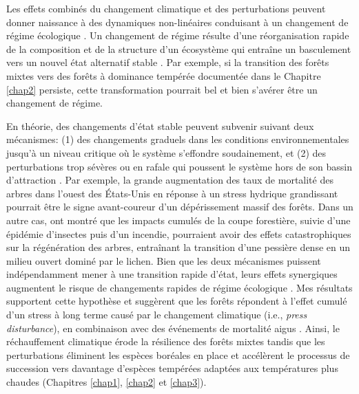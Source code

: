 Les effets combinés du changement climatique et des perturbations
peuvent donner naissance à des dynamiques non-linéaires conduisant à un
changement de régime écologique \citep[\emph{regime shift}; Fig.
\ref{fig4.2};][]{harris_biological_2018, scheffer_catastrophic_2001}. Un
changement de régime résulte d'une réorganisation rapide de la
composition et de la structure d'un écosystème qui entraîne un
basculement vers un nouvel état alternatif stable
\citep{scheffer_catastrophic_2001}. Par exemple, si la transition des
forêts mixtes vers des forêts à dominance tempérée documentée dans le
Chapitre \ref{chap2} persiste, cette transformation pourrait bel et bien
s'avérer être un changement de régime.

En théorie, des changements d'état stable peuvent subvenir suivant deux
mécanismes: (1) des changements graduels dans les conditions
environnementales jusqu'à un niveau critique où le système s'effondre
soudainement, et (2) des perturbations trop sévères ou en rafale qui
poussent le système hors de son bassin d'attraction
\citep{scheffer_catastrophic_2001}. Par exemple, la grande augmentation
des taux de mortalité des arbres dans l'ouest des États-Unis en réponse
à un stress hydrique grandissant \citep{van_mantgem_apparent_2007}
pourrait être le signe avant-coureur d'un dépérissement massif des
forêts. Dans un autre cas, \citet{payette_shift_2003} ont montré que les
impacts cumulés de la coupe forestière, suivie d'une épidémie d'insectes
puis d'un incendie, pourraient avoir des effets catastrophiques sur la
régénération des arbres, entraînant la transition d'une pessière dense
en un milieu ouvert dominé par le lichen. Bien que les deux mécanismes
puissent indépendamment mener à une transition rapide d'état, leurs
effets synergiques augmentent le risque de changements rapides de régime
écologique \citep{harris_biological_2018, scheffer_catastrophic_2001}.
Mes résultats supportent cette hypothèse et suggèrent que les forêts
répondent à l'effet cumulé d'un stress à long terme causé par le
changement climatique (i.e., \emph{press disturbance}), en combinaison
avec des événements de mortalité aigus \citep[i.e., \emph{pulse
disturbance};][]{jentsch_theory_2019, harris_biological_2018}. Ainsi, le
réchauffement climatique érode la résilience des forêts mixtes tandis
que les perturbations éliminent les espèces boréales en place et
accélèrent le processus de succession vers davantage d'espèces tempérées
adaptées aux températures plus chaudes (Chapitres \ref{chap1},
\ref{chap2} et \ref{chap3}).

